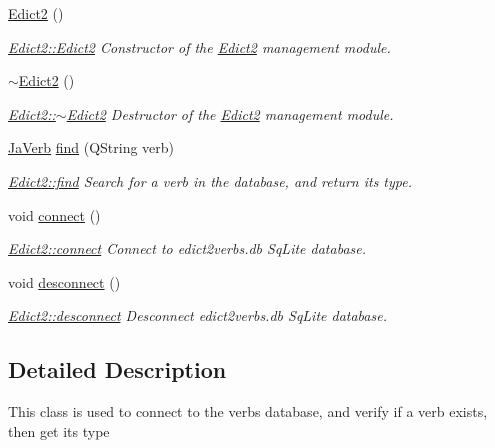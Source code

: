 \begin{DoxyCompactItemize}
\item 
\hyperlink{class_edict2_a8dec1c26f4eb12381dd49419deaa6d7d}{Edict2} ()
\begin{DoxyCompactList}\small\item\em \hyperlink{class_edict2_a8dec1c26f4eb12381dd49419deaa6d7d}{Edict2\+::\+Edict2} Constructor of the \hyperlink{class_edict2}{Edict2} management module. \end{DoxyCompactList}\item 
\hyperlink{class_edict2_ad6121ad9ebcb2836b8289d66a4842372}{$\sim$\+Edict2} ()
\begin{DoxyCompactList}\small\item\em \hyperlink{class_edict2_ad6121ad9ebcb2836b8289d66a4842372}{Edict2\+::$\sim$\+Edict2} Destructor of the \hyperlink{class_edict2}{Edict2} management module. \end{DoxyCompactList}\item 
\hyperlink{struct_edict2_1_1_ja_verb}{Ja\+Verb} \hyperlink{class_edict2_abc792160e9770e32a682b661a16493ba}{find} (Q\+String verb)
\begin{DoxyCompactList}\small\item\em \hyperlink{class_edict2_abc792160e9770e32a682b661a16493ba}{Edict2\+::find} Search for a verb in the database, and return its type. \end{DoxyCompactList}\item 
void \hyperlink{class_edict2_a5674389d9d45962ff1daf40d5fd8695e}{connect} ()
\begin{DoxyCompactList}\small\item\em \hyperlink{class_edict2_a5674389d9d45962ff1daf40d5fd8695e}{Edict2\+::connect} Connect to edict2verbs.\+db Sq\+Lite database. \end{DoxyCompactList}\item 
void \hyperlink{class_edict2_a0a051927cdec6d9108252d25c92394eb}{desconnect} ()
\begin{DoxyCompactList}\small\item\em \hyperlink{class_edict2_a0a051927cdec6d9108252d25c92394eb}{Edict2\+::desconnect} Desconnect edict2verbs.\+db Sq\+Lite database. \end{DoxyCompactList}\end{DoxyCompactItemize}


\subsection{Detailed Description}
This class is used to connect to the verbs\textquotesingle{} database, and verify if a verb exists, then get its type 

